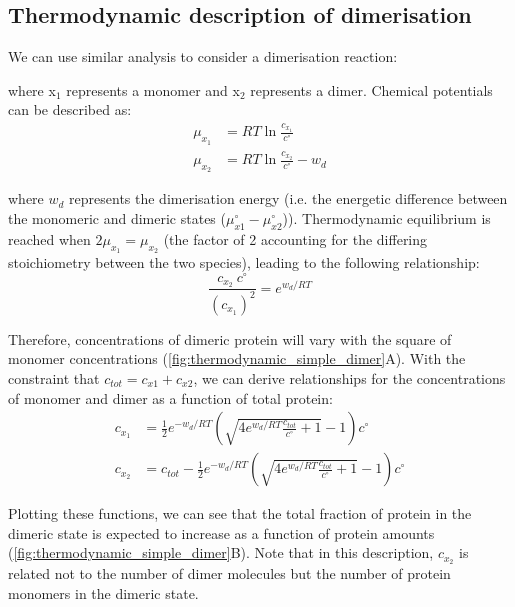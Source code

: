 \documentclass[12pt]{"report"}
\begin{document}
\subsection{Thermodynamic description of dimerisation}

We can use similar analysis to consider a dimerisation reaction:

\begin{center}
\end{center}

where x$_1$ represents a monomer and x$_2$ represents a dimer. Chemical potentials can be described as:
\begin{align}
\mu_{x_1} &= RT\ln \frac{c_{x_1}}{c^{\circ}} \\
\mu_{x_2} &= RT\ln  \frac{c_{x_2}}{c^{\circ}} - w_d
\end{align} 

where $w_d$ represents the dimerisation energy (i.e. the energetic difference between the monomeric and dimeric states ($\mu_{x1}^{\circ} - \mu_{x2}^{\circ}$)). Thermodynamic equilibrium is reached when $2\mu_{x_1} = \mu_{x_2}$ (the factor of 2 accounting for the differing stoichiometry between the two species), leading to the following relationship:
\begin{equation}
\frac{c_{x_2}\:c^{\circ}}{(c_{x_1})^2} = e^{w_d/RT}
\end{equation}

Therefore, concentrations of dimeric protein will vary with the square of monomer concentrations (\cref{fig:thermodynamic_simple_dimer}A). With the constraint that $c_{tot} = c_{x1} + c_{x2}$, we can derive relationships for the concentrations of monomer and dimer as a function of total protein:
\begin{align}
c_{x_1} &= \frac{1}{2}e^{-w_d/RT}\left(\sqrt{4e^{w_d/RT} \frac{c_{tot}}{c^{\circ}} + 1} - 1\right)c^{\circ}\\
c_{x_2} &= c_{tot} - \frac{1}{2}e^{-w_d/RT}\left(\sqrt{4e^{w_d/RT} \frac{c_{tot}}{c^{\circ}} + 1} - 1\right)c^{\circ}
\end{align}

Plotting these functions, we can see that the total fraction of protein in the dimeric state is expected to increase as a function of protein amounts (\cref{fig:thermodynamic_simple_dimer}B). Note that in this description, $c_{x_2}$ is related not to the number of dimer molecules but the number of protein monomers in the dimeric state.\\
\end{document}
